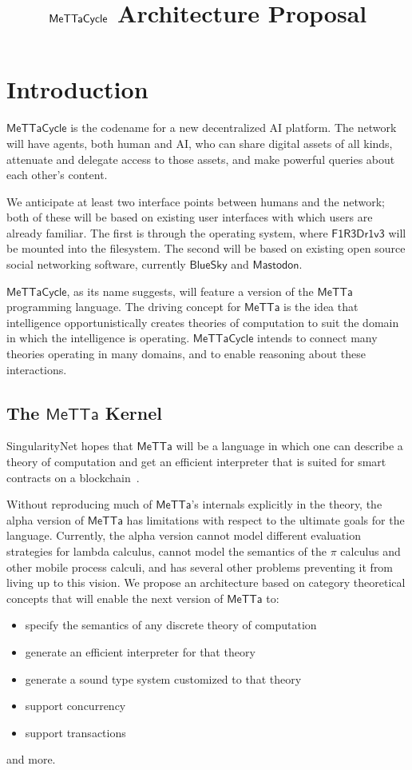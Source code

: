\documentclass{article}
\title{$\MC$ Architecture Proposal}
\author{}
\date{}
\newcommand{\MC}{\mathsf{MeTTaCycle}}
\newcommand{\FD}{\mathsf{F1R3Dr1v3}}
\begin{document}
\maketitle

\tableofcontents

\section{Introduction}

$\MC$ is the codename for a new decentralized AI platform.  The
network will have agents, both human and AI, who can share digital
assets of all kinds, attenuate and delegate access to those assets,
and make powerful queries about each other's content.

We anticipate at least two interface points between humans and the
network; both of these will be based on existing user interfaces with
which users are already familiar.  The first is through the operating
system, where $\FD$ will be mounted into the filesystem.  The second
will be based on existing open source social networking software,
currently $\mathsf{BlueSky}$ and $\mathsf{Mastodon}$.

$\MC$, as its name suggests, will feature a version of the
$\mathsf{MeTTa}$ programming language.  The driving concept for
$\mathsf{MeTTa}$ is the idea that intelligence opportunistically
creates theories of computation to suit the domain in which the
intelligence is operating.  $\MC$ intends to connect many theories
operating in many domains, and to enable reasoning about these
interactions.

\subsection{The $\mathsf{MeTTa}$ Kernel}

SingularityNet hopes that $\mathsf{MeTTa}$ will be a language in which
one can describe a theory of computation and get an efficient
interpreter that is suited for smart contracts on a
blockchain~\cite{GoertzelMeredith2024}.

Without reproducing much of $\mathsf{MeTTa}$'s internals explicitly in
the theory, the alpha version of $\mathsf{MeTTa}$ has limitations with
respect to the ultimate goals for the language. Currently, the
alpha version cannot model different evaluation strategies for
lambda calculus, cannot model the semantics of the $\pi$ calculus and
other mobile process calculi, and has several other problems
preventing it from living up to this vision.  We propose an
architecture based on category theoretical concepts that will enable the next version of $\mathsf{MeTTa}$ to:
\begin{itemize}
    \item specify the semantics of any discrete theory of computation
    \item generate an efficient interpreter for that theory
    \item generate a sound type system customized to that theory
    \item support concurrency
    \item support transactions
\end{itemize}
and more.
\end{document}
